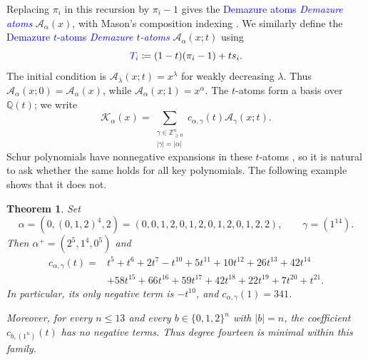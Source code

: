 \documentclass[10pt,reqno]{amsart}
\newtheorem{theorem}{Theorem}
\newcommand{\keyK}{\mathcal{K}}
\newcommand{\atomA}{\mathcal{A}}
\newcommand{\defin}[1]{%
  \relax\ifmmode\textcolor{blue}{#1}%
  \else\textcolor{blue}{\emph{#1}}\fi}
\begin{document}
Replacing $\pi_i$ in this recursion by $\pi_i-1$ gives the
\defin{Demazure atoms} $\atomA_\alpha(x)$, with Mason's composition indexing
\cite[Section~2]{Mason2009}.  We similarly define
the \defin{Demazure $t$-atoms} $\atomA_\alpha(x;t)$ using
\[
 \defin{T_i}\coloneqq(1-t)(\pi_i-1)+t s_i.
\]
The initial condition is $\atomA_\lambda(x;t)=x^\lambda$ for weakly
decreasing $\lambda$.  Thus $\atomA_\alpha(x;0)=\atomA_\alpha(x)$, while
$\atomA_\alpha(x;1)=x^\alpha$.  The $t$-atoms form a basis over $\mathbb{Q}(t)$;
we write
\begin{equation}\label{eq:transition}
 \keyK_\alpha(x)=
 \sum_{\substack{\gamma\in\mathbb{Z}_{\geq0}^n\\|\gamma|=|\alpha|}}
 c_{\alpha,\gamma}(t)\atomA_\gamma(x;t).
\end{equation}
Schur polynomials have nonnegative expansions in these $t$-atoms
\cite[Corollary~31]{Alexandersson2015gbMacdonald}, so it is natural to ask
whether the same holds for all key polynomials.  The following example shows
that it does not.

\begin{theorem}\label{thm:keyCounterexample}
Set
\[
 \alpha=(0,(0,1,2)^4,2)
       =(0,0,1,2,0,1,2,0,1,2,0,1,2,2),
 \qquad \gamma=(1^{14}).
\]
Then $\alpha^+=(2^5,1^4,0^5)$ and
\begin{equation}\label{eq:coefficient}
 \begin{split}
 c_{\alpha,\gamma}(t)={}&t^5+t^6+2t^7-t^{10}+5t^{11}+10t^{12}
 +26t^{13}+42t^{14}\\
 &+58t^{15}+66t^{16}+59t^{17}+42t^{18}+22t^{19}
 +7t^{20}+t^{21}.
 \end{split}
\end{equation}
In particular, its only negative term is $-t^{10}$, and
$c_{\alpha,\gamma}(1)=341$.

Moreover, for every $n\leq13$ and every
$b\in\{0,1,2\}^n$ with $|b|=n$, the coefficient
$c_{b,(1^n)}(t)$ has no negative terms.  Thus degree fourteen is minimal
within this family.
\end{theorem}
\end{document}
